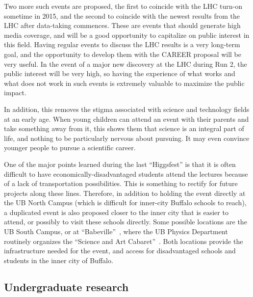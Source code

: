 \documentclass[12pt]{proposalnsf}
\begin{document}
Two more such events are proposed, the first to coincide with the LHC
turn-on sometime in 2015, and the second to coincide with the newest
results from the LHC after data-taking commences. These are 
events that should generate high media coverage, and will be a good
opportunity to capitalize on public interest in this field. Having
regular events to discuss the LHC results is a very long-term goal,
and the opportunity to develop them with the CAREER proposal
will be very useful. In the event of a major new discovery at the LHC
during Run 2, the public interest will be very high, so having the
experience of what works and what does not work in such events is
extremely valuable to maximize the public impact. 

In addition, this removes the stigma associated with science and
technology fields at an early age. When young children can attend an
event with their parents and take something away from it, this shows
them that science is an integral part of life, and nothing to be
particularly nervous about pursuing. It may even convince younger
people to pursue a scientific career. 

One of the major points learned during the last ``Higgsfest''
is that it is often difficult to have economically-disadvantaged
students attend the lectures because of a lack of transportation
possibilities. This is something to rectify for future
projects along these lines. Therefore, in addition to holding the
event directly
at the UB North Campus (which is difficult for inner-city
Buffalo schools to reach), a duplicated event is also proposed
closer to the inner city that is easier to attend, or possibly to
visit these schools directly. Some possible
locations are the UB South Campus, or at
``Babeville''~\cite{babeville}, where the UB Physics
Department routinely organizes the ``Science and Art
Cabaret''~\cite{cabaret}. Both locations 
provide the infrastructure needed for the event, and
access for disadvantaged schools and students in the inner city of
Buffalo. 





\subsection{Undergraduate research}
\end{document}
